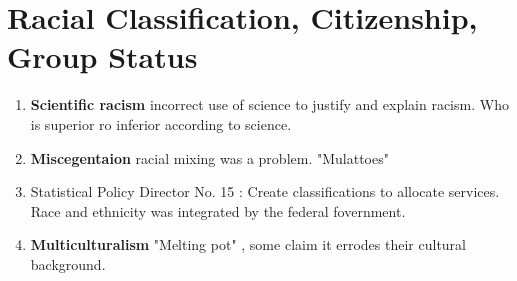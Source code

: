 \documentclass{article}
\begin{document}
\section*{Racial Classification, Citizenship, Group Status}
\begin{enumerate}
    \item \textbf{Scientific racism} incorrect use of science to justify and explain racism. Who is superior ro inferior according to science.  
    \item \textbf{Miscegentaion} racial mixing was a problem. "Mulattoes"
    \item Statistical Policy Director No. 15 : Create classifications to allocate services. Race and ethnicity was integrated by the federal fovernment. 
    \item \textbf{Multiculturalism} "Melting pot" , some claim it errodes their cultural background. 
\end{enumerate}
\end{document}
